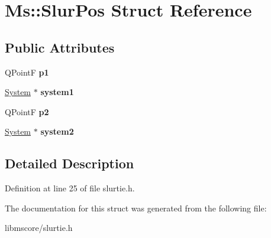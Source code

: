 \hypertarget{struct_ms_1_1_slur_pos}{}\section{Ms\+:\+:Slur\+Pos Struct Reference}
\label{struct_ms_1_1_slur_pos}
\subsection*{Public Attributes}
\begin{DoxyCompactItemize}
\item 
\mbox{\label{struct_ms_1_1_slur_pos_abed528378f178fbb4e2f7ce6b6105744}} 
Q\+PointF {\bfseries p1}
\item 
\mbox{\label{struct_ms_1_1_slur_pos_acf0454776eebbf729fb721f41d43181d}} 
\hyperlink{class_ms_1_1_system}{System} $\ast$ {\bfseries system1}
\item 
\mbox{\label{struct_ms_1_1_slur_pos_ac07e90be2bbe58c95be136f9b0598b5f}} 
Q\+PointF {\bfseries p2}
\item 
\mbox{\label{struct_ms_1_1_slur_pos_a378efcaebc19f4c22951b1b72ecc58cf}} 
\hyperlink{class_ms_1_1_system}{System} $\ast$ {\bfseries system2}
\end{DoxyCompactItemize}


\subsection{Detailed Description}


Definition at line 25 of file slurtie.\+h.



The documentation for this struct was generated from the following file\+:\begin{DoxyCompactItemize}
\item 
libmscore/slurtie.\+h\end{DoxyCompactItemize}
